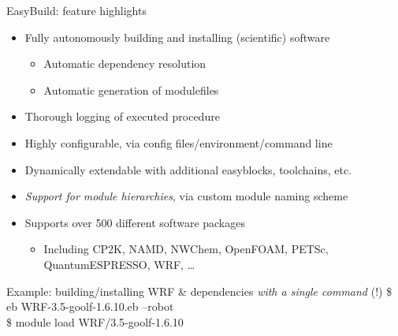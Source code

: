 \documentclass[10pt,xcolor={usenames,dvipsnames}]{beamer}
\begin{document}
\begin{frame}{EasyBuild: feature highlights}
\begin{itemize}
    \item
        Fully autonomously building and installing (scientific) software
        \begin{itemize}
            \item
                Automatic dependency resolution
            \item
                Automatic generation of modulefiles
        \end{itemize}
    \item
        Thorough logging of executed procedure
    \item
        Highly configurable, via config files/environment/command line
    \item
        Dynamically extendable with additional easyblocks, toolchains, etc.
    \item
        \emph{Support for module hierarchies}, via custom module naming scheme
    \item
        Supports over 500 different software packages
        \begin{itemize}
            \item
                Including CP2K, NAMD, NWChem, OpenFOAM, PETSc, QuantumESPRESSO,
                WRF, \ldots
        \end{itemize}
\end{itemize}
\quad\quad
\begin{minipage}{0.9\textwidth}
    \begin{exampleblock}{Example: building/installing WRF \& dependencies \emph{with a single command} (!)}
        \ttfamily
        \$ eb WRF-3.5-goolf-1.6.10.eb --robot\\
        \$ module load WRF/3.5-goolf-1.6.10
    \end{exampleblock}
\end{minipage}
\end{frame}

\end{document}
